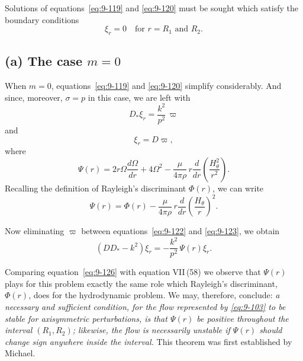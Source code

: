 Solutions of equations~\eqref{eq:9-119} and \eqref{eq:9-120} must be sought which satisfy the boundary conditions
\begin{equation}
\xi_r = 0 \quad \text{for } r = R_1 \text{ and } R_2. \label{eq:9-121}
\end{equation}

\subsection*{(a) The case $m = 0$}

When $m = 0$, equations~\eqref{eq:9-119} and \eqref{eq:9-120} simplify considerably. And since, moreover, $\sigma = p$ in this case, we are left with
\begin{equation}
D_*\xi_r = \frac{k^2}{p^2}\,\varpi \label{eq:9-122}
\end{equation}
and
\begin{equation}
[p^2 - \Psi(r)]\xi_r = D\varpi, \label{eq:9-123}
\end{equation}
where
\begin{equation}
\Psi(r) = 2r\Omega\frac{d\Omega}{dr} + 4\Omega^2 - \frac{\mu}{4\pi\rho}\, r\frac{d}{dr}\!\left(\frac{H_\theta^2}{r^2}\right). \label{eq:9-124}
\end{equation}
Recalling the definition of Rayleigh's discriminant $\Phi(r)$, we can write
\begin{equation}
\Psi(r) = \Phi(r) - \frac{\mu}{4\pi\rho}\, r\frac{d}{dr}\!\left(\frac{H_\theta}{r}\right)^2. \label{eq:9-125}
\end{equation}

Now eliminating $\varpi$ between equations~\eqref{eq:9-122} and \eqref{eq:9-123}, we obtain
\begin{equation}
(DD_* - k^2)\xi_r = -\frac{k^2}{p^2}\, \Psi(r)\xi_r. \label{eq:9-126}
\end{equation}

Comparing equation~\eqref{eq:9-126} with equation VII\,(58) we observe that $\Psi(r)$ plays for this problem exactly the same role which Rayleigh's discriminant, $\Phi(r)$, does for the hydrodynamic problem. We may, therefore, conclude: \emph{a necessary and sufficient condition, for the flow represented by \eqref{eq:9-103} to be stable for axisymmetric perturbations, is that $\Psi(r)$ be positive throughout the interval $(R_1, R_2)$; likewise, the flow is necessarily unstable if $\Psi(r)$ should change sign anywhere inside the interval.} This theorem was first established by Michael.

